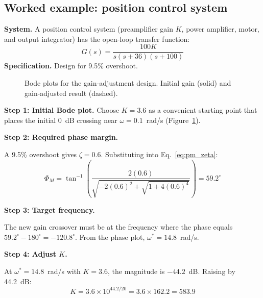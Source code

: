 \documentclass[../../book.tex]{subfiles}
\begin{document}
\subsection{Worked example: position control system}
\label{sec:design_example}

\textbf{System.}  A position control system (preamplifier gain $K$, power
amplifier, motor, and output integrator) has the open-loop transfer function:
\begin{equation}
  G(s) = \frac{100K}{s(s+36)(s+100)}
  \label{eq:ex2_loop}
\end{equation}
\textbf{Specification.}  Design for 9.5\% overshoot.

\begin{figure}[htbp]
  \caption{Bode plots for the gain-adjustment design.  Initial gain (solid)
    and gain-adjusted result (dashed).}
  \label{fig:ex_design}
\end{figure}

\textbf{Step 1: Initial Bode plot.}  Choose $K = 3.6$ as a convenient starting
point that places the initial 0~dB crossing near $\omega = 0.1$~rad/s
(Figure~\ref{fig:ex_design}).

\textbf{Step 2: Required phase margin.}

A 9.5\% overshoot gives $\zeta = 0.6$.  Substituting into
Eq.~\eqref{eq:pm_zeta}:
\[
  \Phi_M = \tan^{-1}\!\left(\frac{2(0.6)}{\sqrt{-2(0.6)^2+\sqrt{1+4(0.6)^4}}}\right) = 59.2^\circ
\]

\textbf{Step 3: Target frequency.}

The new gain crossover must be at the frequency where the phase equals
$59.2^\circ - 180^\circ = -120.8^\circ$.  From the phase plot,
$\omega^* = 14.8$~rad/s.

\textbf{Step 4: Adjust $K$.}

At $\omega^* = 14.8$~rad/s with $K = 3.6$, the magnitude is $-44.2$~dB.
Raising by 44.2~dB:
\[
  K = 3.6 \times 10^{44.2/20} = 3.6 \times 162.2 = 583.9
\]
\end{document}
